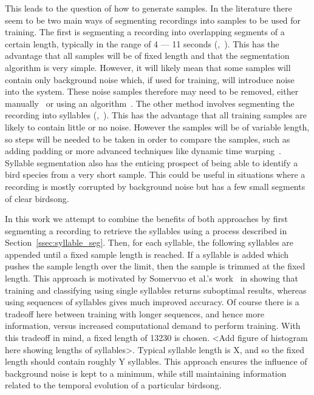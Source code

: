 This leads to the question of how to generate samples. In the literature there
seem to be two main ways of segmenting recordings into samples to be used for
training. The first is segmenting a recording into overlapping segments of a
certain length, typically in the range of 4 --- 11 seconds
(\cite{yan2021birdsong},~\cite{crous2019polyphonic}). This has the advantage
that all samples will be of fixed length and that the segmentation algorithm is
very simple. However, it will likely mean that some samples will contain only
background noise which, if used for training, will introduce noise into the
system. These noise samples therefore may need to be removed, either
manually~\cite{yan2021birdsong} or using an
algorithm~\cite{narasimhan2017simultaneous}. The other method involves
segmenting the recording into syllables
(\cite{fagerlund2007bird},~\cite{ramashini2022robust}). This has the advantage
that all training samples are likely to contain little or no noise. However the
samples will be of variable length, so steps will be needed to be taken in order
to compare the samples, such as adding padding or more advanced techniques like
dynamic time warping~\cite{somervuo2006parametric}. Syllable segmentation also
has the enticing prospect of being able to identify a bird species from a very
short sample. This could be useful in situations where a recording is mostly
corrupted by background noise but has a few small segments of clear birdsong.

In this work we attempt to combine the benefits of both approaches by first
segmenting a recording to retrieve the syllables using a process described in
Section~\ref{ssec:syllable_seg}. Then, for each syllable, the
following syllables are appended until a fixed sample length is reached. If a
syllable is added which pushes the sample length over the limit, then the sample
is trimmed at the fixed length. This approach is motivated by Somervuo et al.'s
work~\cite{somervuo2006parametric} in showing that training and classifying
using single syllables returns suboptimal results, whereas using sequences of
syllables gives much improved accuracy. Of course there is a tradeoff here
between training with longer sequences, and hence more information, versus
increased computational demand to perform training. With this tradeoff in mind,
a fixed length of 13230 is chosen. <Add figure of histogram here showing lengths
of syllables>. Typical syllable length is X, and so the fixed length should
contain roughly Y syllables. This approach ensures the influence of background
noise is kept to a minimum, while still maintaining information related to the
temporal evolution of a particular birdsong.

